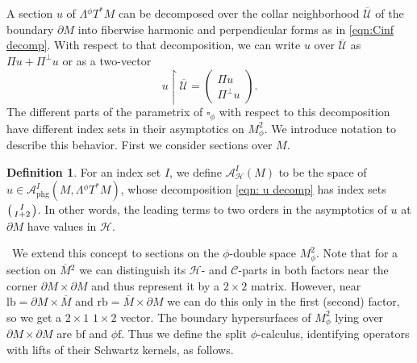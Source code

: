 \documentclass[JEP,XML,SOM,Unicode,NoFloatCountersInSection,published]{cedram}
\newenvironment{smallpmatrix}{\big(\begin{smallmatrix}}{\end{smallmatrix}\big)}
\theoremstyle{plain}
\theoremstyle{definition}
\newtheorem{defn}[Th]{Definition}
\newcommand{\Umathbar}{{\overline{\mathscr{U}}}}
\newcommand\calA{{\mathcal A}}
\newcommand {\phg}{{\mathrm{phg}}}
\newcommand{\phif}{{\phi\mathrm{f}}}
\newcommand{\lf}{{\mathrm{lb}}}
\newcommand{\rf}{{\mathrm{rb}}}
\newcommand{\bbf}{{\mathrm{bf}}}
\newcommand{\dM}{{\partial M}}
\newcommand{\Piperp}{\Pi^\perp}
\newcommand{\Mbar}{{\overline{M}}}\let\M\Mbar
\begin{document}
A section $u$ of $\Lambda {}^\phi T^*M$ can be decomposed over the collar neighborhood $\Umathbar$ of the
boundary $\partial M$
into fiberwise harmonic and perpendicular forms as in \eqref{eqn:Cinf decomp}. With
respect to that decomposition, we can write $u$ over $\Umathbar$ as $\Pi u+\Piperp u$ or as a two-vector%
\begin{equation}
\label{eqn: u decomp}
u \restriction \Umathbar = \begin{pmatrix}
\Pi u \\ \Pi^\perp u
\end{pmatrix}.
\end{equation}
The different parts of the parametrix of $\square_\phi$ with respect to this decomposition
have different index sets in their asymptotics on $M^2_\phi$. We introduce notation to describe
this behavior. First we consider sections over $M$.

\begin{defn} \label{def:split phg space}
For an index set $I$, we define $\calA^I_{\mathscr{H}}(M)$ to be the space of
$u\in\calA^I_{\phg}(M, \Lambda {}^\phi T^*M)$, whose
decomposition \eqref{eqn: u decomp} has index sets
$
\begin{smallpmatrix}
I \\ I+2
\end{smallpmatrix}
$.
In other words, the leading terms to two orders in the
asymptotics of $u$ at $\partial M$ have values in $\mathscr{H}$.
\end{defn}
\
We extend this concept to sections
on the $\phi$-double space
$M^2_\phi$. Note that for a section on $\Mbar{}^2$ we can distinguish its
$\mathscr{H}$- and $\mathscr{C}$-parts in both factors near the corner $\dM\times\dM$
and thus represent it by a $2\times2$ matrix. However, near $\lf=\dM\times \Mbar$
and $\rf=\Mbar\times\dM$ we can do this only in the first (\resp second) factor, so we get a $2\times1$ \resp $1\times2$ vector. The boundary hypersurfaces of $M^2_\phi$ lying over $\dM\times\dM$ are $\bbf$ and $\phif$. Thus we
define the split $\phi$-calculus, identifying operators with lifts of their Schwartz kernels, as follows.
\end{document}
